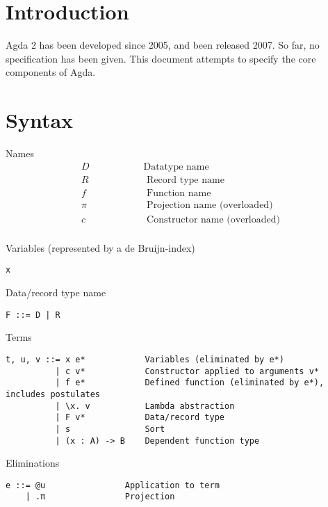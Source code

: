 \documentclass[acmlarge]{acmart}\settopmatter{}
\begin{document}
\section{Introduction}

Agda 2 has been developed since 2005, and been released 2007.  So far,
no specification has been given.  This document attempts to specify
the core components of Agda.


\section{Syntax}
\label{sec:syntax}

Names
\[
\begin{array}{ll}
D   & \hspace{2cm}\text{Datatype name} \\
  R & \hspace{2cm}\text{   Record type name} \\
  f & \hspace{2cm}\text{   Function name} \\
\pi & \hspace{2cm}\text{  Projection name  (overloaded)} \\
  c & \hspace{2cm}\text{   Constructor name (overloaded)} \\
\end{array}
\]

Variables (represented by a de Bruijn-index)
\begin{verbatim}
x
\end{verbatim}

Data/record type name
\begin{verbatim}
F ::= D | R
\end{verbatim}

Terms
\begin{verbatim}
t, u, v ::= x e*            Variables (eliminated by e*)
          | c v*            Constructor applied to arguments v*
          | f e*            Defined function (eliminated by e*), includes postulates
          | \x. v           Lambda abstraction
          | F v*            Data/record type
          | s               Sort
          | (x : A) -> B    Dependent function type
\end{verbatim}

Eliminations
\begin{verbatim}
e ::= @u                Application to term
    | .π                Projection
\end{verbatim}
\end{document}
